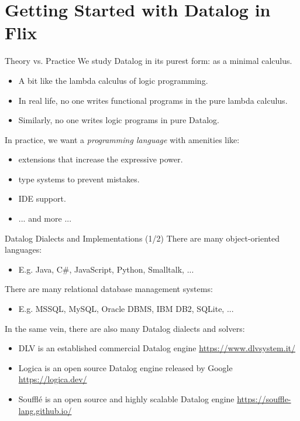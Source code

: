 \section{Getting Started with Datalog in Flix}

\begin{frame}{Theory vs. Practice}
We study Datalog in its purest form: as a minimal calculus.
\begin{itemize}
    \item A bit like the lambda calculus of logic programming. 
    \item In real life, no one writes functional programs in the pure lambda calculus. 
    \item Similarly, no one writes logic programs in pure Datalog.
\end{itemize}

\pause

In practice, we want a \emph{programming language} with amenities like:
\begin{itemize}
    \item extensions that increase the expressive power.
    \item type systems to prevent mistakes.
    \item IDE support.
    \item ... and more ...
\end{itemize}
\end{frame}

\begin{frame}{Datalog Dialects and Implementations (1/2)}
There are many object-oriented languages:
\begin{itemize}
    \item E.g. Java, C\#, JavaScript, Python, Smalltalk, ...
\end{itemize}

\pause

There are many relational database management systems:
\begin{itemize}
    \item E.g. MSSQL, MySQL, Oracle DBMS, IBM DB2, SQLite, ...
\end{itemize}

\pause

In the same vein, there are also many Datalog dialects and solvers:

\begin{itemize}
    \item DLV is an established commercial Datalog engine {\small
    \url{https://www.dlvsystem.it/}}
    \item Logica is an open source Datalog engine released by Google
    \small
    \url{https://logica.dev/}
    \item Souffl\'e is an open source and highly scalable Datalog engine {\small
    \url{https://souffle-lang.github.io/}}
\end{itemize}
\end{frame}

